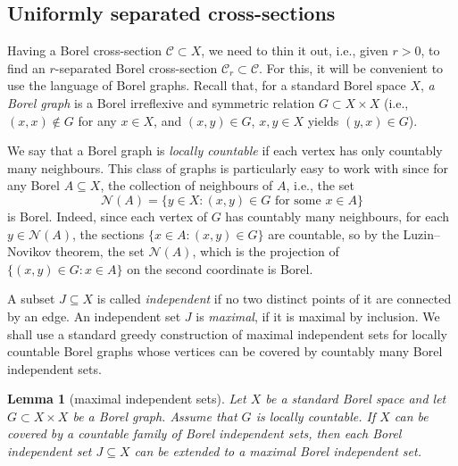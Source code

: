 \documentclass[11pt]{paper}
\newtheorem{lemma}{Lemma}
\newcommand{\cC}{\mathcal C}
\begin{document}
\subsection{Uniformly separated cross-sections}
\label{subsect:unif-separated}

Having a Borel cross-section $\cC \subset X$, we need to thin it out, i.e., given $r>0$, to find
an $r$-separated Borel cross-section $\cC_r \subset \cC$. For this, it will be convenient to use the
language of Borel graphs.  Recall that, for a standard Borel space $X$, {\em a Borel graph} is a
Borel irreflexive and symmetric relation $G\subset X\times X$ (i.e., $(x,x)\notin G$ for any
$x\in X$, and $(x, y)\in G$, $x, y\in X$ yields $(y, x)\in G$).

We say that a Borel graph is
\emph{locally countable} if each vertex has only countably many neighbours.  This class of graphs is
particularly easy to work with since for any Borel \(A \subseteq X\), the collection of neighbours of
\(A\), i.e., the set \[\mathcal N(A)=\{y \in X : (x,y) \in G \text{ for some } x \in A\}\]
is Borel.  Indeed, since each vertex of $G$ has countably many neighbours, for each $y\in\mathcal N(A)$,
the sections $\{x\in A\colon (x, y)\in G\}$ are countable, so by the Luzin--Novikov theorem, the set
$\mathcal N(A)$, which is the projection of $\{(x, y)\in G\colon x\in A\}$ on the second coordinate
is Borel.

A subset $J\subseteq X$ is called {\em independent} if no two distinct points of it are connected by
an edge. An independent set $J$ is {\em maximal}, if it is maximal by inclusion.
We shall use a standard greedy construction of maximal independent sets
for locally countable Borel graphs whose vertices can be covered by countably many Borel independent sets.


\begin{lemma}[maximal independent sets]\label{lemma:indep_sets_independent_cover}
Let $X$ be a standard Borel space and let $G\subset X\times X$ be a Borel graph. Assume that
$G$ is locally countable. If \(X\) can be
covered by a countable family of Borel independent sets, then each Borel independent set $J\subseteq X$
can be extended to a maximal Borel independent set.
\end{lemma}
\end{document}
